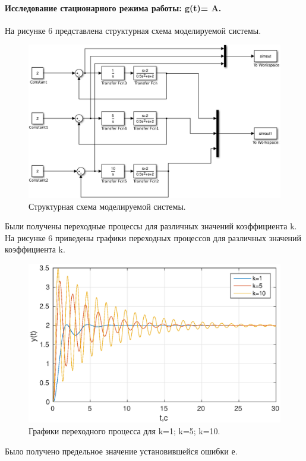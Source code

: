 \documentclass[a4paper,14pt]{article}
\begin{document}
\paragraph{Исследование стационарного режима работы: g(t)= A.}
На рисунке 6 представлена структурная схема моделируемой системы.

\begin{figure}[H]
\centering
\includegraphics[width=\textwidth]{1/cxema_2.eps}
\caption{Структурная схема моделируемой  системы.}
\end{figure}
Были получены переходные процессы для различных значений коэффициента  k.
На рисунке 6 приведены графики переходных процессов  для различных значений коэффициента  k.

\begin{figure}[H]
\centering
\includegraphics[width=\textwidth]{1/2_1y(t).eps}
\caption{Графики переходного процесса для k=1; k=5; k=10.}
\end{figure}
Было получено предельное значение установившейся ошибки е.
\end{document}
